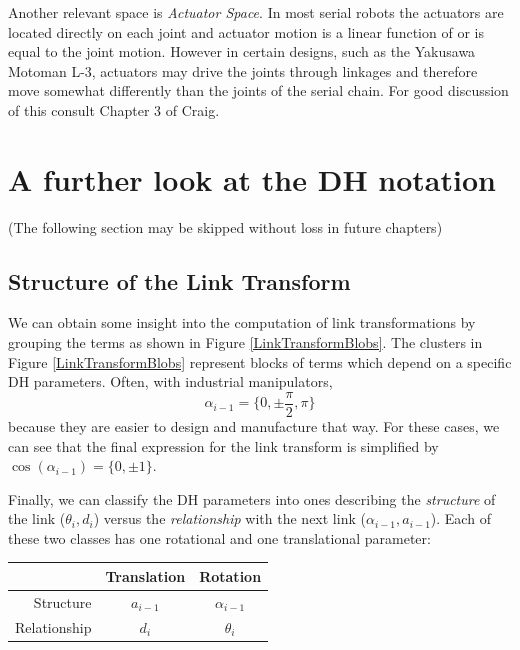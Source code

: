 Another relevant space is {\it Actuator Space}.   In most serial robots the actuators are located directly on each joint and actuator motion is a linear function of or is equal to the joint motion.   However in certain designs, such as the Yakusawa Motoman L-3, actuators may drive the joints through linkages and therefore move somewhat differently than the joints of the serial chain.  For good discussion of this consult Chapter 3 of Craig.


\newpage
\section{A further look at  the DH notation}
(The following section may be skipped without loss in future chapters)

\subsection{Structure of the Link Transform}

We can obtain some insight into the computation of link transformations by grouping the terms as shown in Figure \ref{LinkTransformBlobs}.  The clusters in Figure \ref{LinkTransformBlobs} represent blocks of terms which depend on a specific DH parameters.  Often, with industrial manipulators,
\[
\alpha_{i-1} = \{ 0, \pm \frac{\pi}{2}, \pi \}
\]
because they are easier to design and manufacture that way.   For these cases, we can see that the final expression for the link transform is simplified by $\cos(\alpha_{i-1}) = \{0,\pm1\}$.

Finally, we can classify the DH parameters into ones describing the {\it structure} of the link ($\theta_i, d_i$) versus the {\it relationship} with the next link ($\alpha_{i-1}, a_{i-1}$).  Each of these two classes has one rotational and one translational parameter:

\begin{center}
\begin{tabular}{r|cc}
            & Translation & Rotation \\ \hline
Structure   &  $a_{i-1}$ & $\alpha_{i-1}$  \\
Relationship &  $d_i$      & $\theta_i $    \\

\end{tabular}
\end{center}


